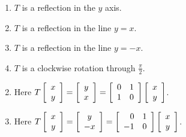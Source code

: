 \begin{multicols}{2}
\begin{ex}
\begin{enumerate}[label={\alph*.}]
\item $T$ is a reflection in the $y$ axis.

\item $T$ is a reflection in the line $y = x$.

\item $T$ is a reflection in the line $y = -x$.

\item $T$ is a clockwise rotation through $\frac{\pi}{2}$.


\end{enumerate}
\begin{sol}
\begin{enumerate}[label={\alph*.}]
\setcounter{enumi}{1}
\item  Here $T \left[ \begin{array}{c}
x \\
y
\end{array} \right] = \left[ \begin{array}{c}
y \\
x
\end{array} \right]  = \left[ \begin{array}{rr}
0 & 1 \\
1 & 0
\end{array} \right] \left[ \begin{array}{c}
x \\
y
\end{array} \right]$.


\setcounter{enumi}{3}
\item  Here $T \left[ \begin{array}{c}
x \\
y
\end{array} \right] = \left[ \begin{array}{c}
y \\
-x
\end{array} \right] = \left[ \begin{array}{rr}
0 & 1 \\
-1 & 0
\end{array} \right] \left[ \begin{array}{c}
x \\
y
\end{array} \right]$.

\end{enumerate}
\end{sol}
\end{ex}


\end{multicols}
